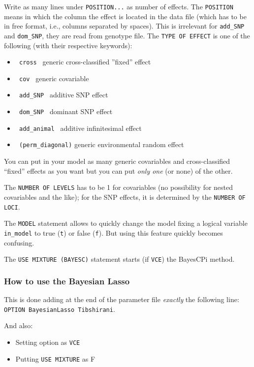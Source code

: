 \documentclass[a4paper,12pt,titlepage]{article}      %
\newcommand{\tm}{\texttt} %
\begin{document}
Write as many lines under \texttt{POSITION...} as number of effects. The \texttt{POSITION} means in which the column the effect is located in the data file (which has to be in free format, i.e., columns separated by spaces). This is irrelevant for \texttt{add\_SNP} and \texttt{dom\_SNP}, they are read from genotype file. The \tm{TYPE OF EFFECT} is one of the following (with their respective keywords):
\begin{itemize}
  \item   \texttt{ cross }
       generic cross-classified ''fixed'' effect
  \item  \texttt{ cov }
       generic covariable 
  \item     \texttt{ add\_SNP }
         additive SNP effect
  \item   \texttt{ dom\_SNP }
       dominant SNP effect
  \item   \texttt{ add\_animal }
       additive infinitesimal effect
   \item  \texttt{ (perm\_diagonal)}
       generic environmental random effect 
\end{itemize}
You can put in your model as many generic covariables and cross-classified ``fixed'' effects as you want but you can put \emph{only one} (or none) of the other. 

The \tm{NUMBER OF LEVELS} has to be 1 for covariables (no possibility for nested covariables and the like); for the SNP effects, it is determined by the \tm{NUMBER OF LOCI}.

The \tm{MODEL} statement allows to quickly change the model fixing a logical variable \tm{in\_model} to true (\tm{t}) or false (\tm{f}). But using this feature quickly becomes confusing.

The \tm{USE MIXTURE (BAYESC)} statement starts (if \tm{VCE}) 
the BayesCPi method.

\subsubsection{How to use the Bayesian Lasso}
This is done adding at the end of the parameter file \emph{exactly} the following line:
\texttt{OPTION BayesianLasso Tibshirani}.

And also:
\begin{itemize}
\item Setting option as \texttt{VCE}
\item Putting \texttt{USE MIXTURE} as F
\end{itemize}
\end{document}
